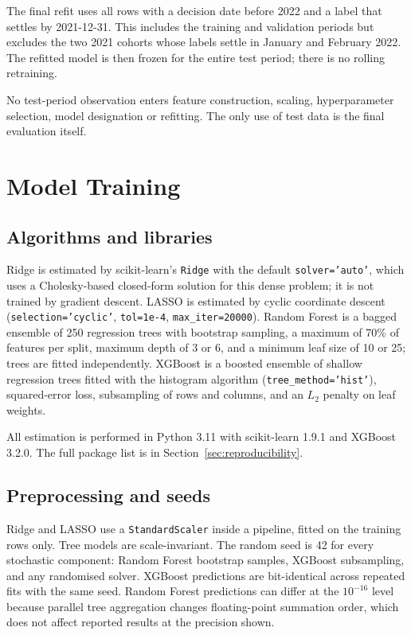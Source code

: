 \documentclass[11pt,a4paper]{article}
\begin{document}
The final refit uses all rows with a decision date before 2022 and a label that settles by 2021-12-31. This includes the training and validation periods but excludes the two 2021 cohorts whose labels settle in January and February 2022. The refitted model is then frozen for the entire test period; there is no rolling retraining.

No test-period observation enters feature construction, scaling, hyperparameter selection, model designation or refitting. The only use of test data is the final evaluation itself.


\section{Model Training}
\label{sec:training}

\subsection{Algorithms and libraries}

Ridge is estimated by scikit-learn's \texttt{Ridge} with the default \texttt{solver='auto'}, which uses a Cholesky-based closed-form solution for this dense problem; it is not trained by gradient descent. LASSO is estimated by cyclic coordinate descent (\texttt{selection='cyclic'}, \texttt{tol=1e-4}, \texttt{max\_iter=20000}). Random Forest is a bagged ensemble of 250 regression trees \citep{breiman2001} with bootstrap sampling, a maximum of 70\% of features per split, maximum depth of 3 or 6, and a minimum leaf size of 10 or 25; trees are fitted independently. XGBoost is a boosted ensemble of shallow regression trees \citep{chen2016} fitted with the histogram algorithm (\texttt{tree\_method='hist'}), squared-error loss, subsampling of rows and columns, and an $L_2$ penalty on leaf weights.

All estimation is performed in Python 3.11 with scikit-learn 1.9.1 and XGBoost 3.2.0. The full package list is in Section~\ref{sec:reproducibility}.

\subsection{Preprocessing and seeds}

Ridge and LASSO use a \texttt{StandardScaler} inside a pipeline, fitted on the training rows only. Tree models are scale-invariant. The random seed is 42 for every stochastic component: Random Forest bootstrap samples, XGBoost subsampling, and any randomised solver. XGBoost predictions are bit-identical across repeated fits with the same seed. Random Forest predictions can differ at the $10^{-16}$ level because parallel tree aggregation changes floating-point summation order, which does not affect reported results at the precision shown.
\end{document}
